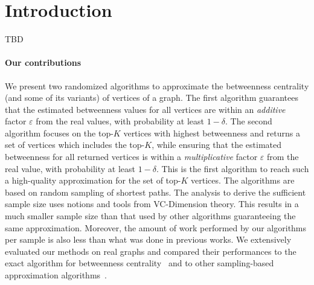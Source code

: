 \section{Introduction}\label{sec:intro}
\XXX TBD

\paragraph{Our contributions} 
We present two randomized algorithms to approximate the betweenness centrality
(and some of its variants) of vertices of a graph. The first algorithm
guarantees that the estimated betweenness values for all vertices are within an
\emph{additive} factor $\varepsilon$ from the real values, with probability at
least $1-\delta$. The second algorithm focuses on the top-$K$ vertices with
highest betweenness and returns a set of vertices which includes the top-$K$,
while ensuring that the estimated betweenness for all returned vertices is
within a \emph{multiplicative} factor $\varepsilon$ from the real value, with
probability at least $1-\delta$. This is the first algorithm to reach such a
high-quality approximation for the set of top-$K$ vertices. The algorithms are
based on random sampling of shortest paths. The analysis to derive the
sufficient sample size uses notions and tools from VC-Dimension theory. This
results in a much smaller sample size than that used by other algorithms
guaranteeing the same approximation. Moreover, the amount of work performed by
our algorithms per sample is also less than what was done in previous works.
We extensively evaluated our methods on real graphs and compared their
performances to the exact algorithm for betweenness
centrality~\citep{Brandes01} and to other sampling-based approximation
algorithms~\citep{JacobKLPT05,BrandesP07}.


